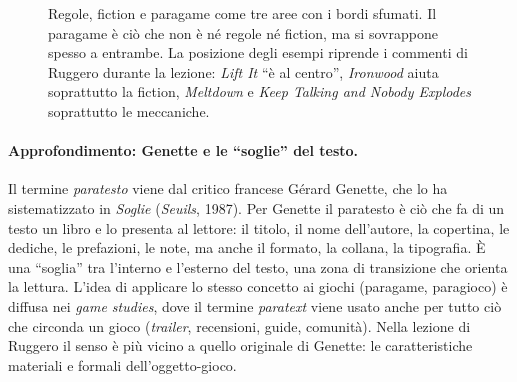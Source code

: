 \begin{figure}[htbp]
\centering
{}
\caption{Regole, fiction e paragame come tre aree con i bordi sfumati. Il paragame è
ciò che non è né regole né fiction, ma si sovrappone spesso a entrambe. La posizione
degli esempi riprende i commenti di Ruggero durante la lezione: \emph{Lift It} ``è al
centro'', \emph{Ironwood} aiuta soprattutto la fiction, \emph{Meltdown} e \emph{Keep
Talking and Nobody Explodes} soprattutto le meccaniche.}
\label{a10:fig:aree}
\end{figure}

\paragraph{Approfondimento: Genette e le ``soglie'' del testo.} Il termine
\emph{paratesto} viene dal critico francese Gérard Genette, che lo ha sistematizzato in
\emph{Soglie} (\emph{Seuils}, 1987). Per Genette il paratesto è ciò che fa di un testo
un libro e lo presenta al lettore: il titolo, il nome dell'autore, la copertina, le
dediche, le prefazioni, le note, ma anche il formato, la collana, la tipografia. È una
``soglia'' tra l'interno e l'esterno del testo, una zona di transizione che orienta la
lettura. L'idea di applicare lo stesso concetto ai giochi (paragame, paragioco) è
diffusa nei \emph{game studies}, dove il termine \emph{paratext} viene usato anche per
tutto ciò che circonda un gioco (\emph{trailer}, recensioni, guide, comunità). Nella
lezione di Ruggero il senso è più vicino a quello originale di Genette: le
caratteristiche materiali e formali dell'oggetto-gioco.

